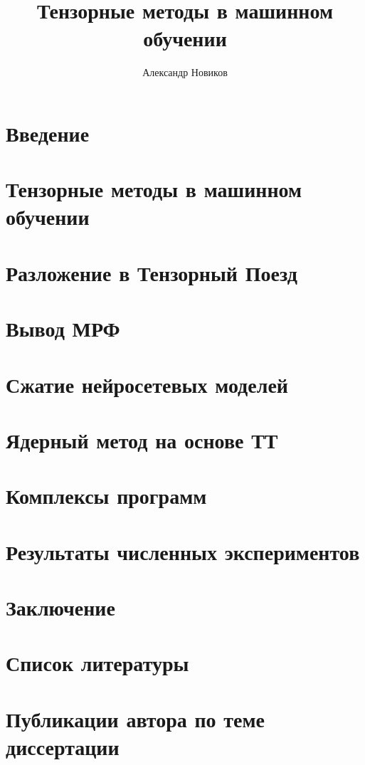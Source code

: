 \documentclass{article} %
\title{Тензорные методы в машинном обучении}
\author{Александр Новиков}
\begin{document}
\maketitle

\section{Введение}
\section{Тензорные методы в машинном обучении}
\section{Разложение в Тензорный Поезд}
\section{Вывод МРФ}
\section{Сжатие нейросетевых моделей}
\section{Ядерный метод на основе ТТ}
\section{Комплексы программ}
\section{Результаты численных экспериментов}
\section{Заключение}
\section{Список литературы}
\section{Публикации автора по теме диссертации}
\end{document}
